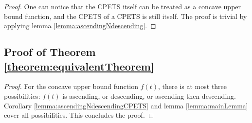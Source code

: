 \begin{proof}
One can notice that the CPETS itself can be treated as a concave upper bound function, and the CPETS of a CPETS is still itself. The proof is trivial by applying lemma \ref{lemma:ascendingNdescending}.
\end{proof}

\subsection{Proof of Theorem \ref{theorem:equivalentTheorem}}

\begin{proof}
For the concave upper bound function $f(t)$, there is at most three possibilities: $f(t)$ is ascending, or descending, or ascending then descending. Corollary \ref{lemma:ascendingNdescendingCPETS} and lemma \ref{lemma:mainLemma} cover all possibilities. This concludes the proof.
\end{proof}
